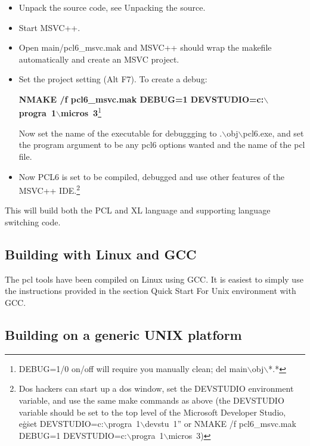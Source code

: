 \documentclass[10pt]{article}
\begin{document}
\begin{itemize}
\item  Unpack the source code, see Unpacking the source.

\item  Start MSVC++.
  
\item Open main/pcl6\_msvc.mak and MSVC++ should wrap the makefile
  automatically and create an MSVC project.
  
\item Set the project setting (Alt F7).  To create a debug:
  
  \textbf{NMAKE /f pcl6\_msvc.mak DEBUG=1
    DEVSTUDIO=c:$\backslash$progra~1$\backslash$micros~3}\footnote{DEBUG=1/0
    on/off will require you manually clean; del
    main$\backslash$obj$\backslash$*.*}
  
  Now set the name of the executable for debuggging to
  $.$$\backslash$obj$\backslash$pcl6.exe, and set the program argument
  to be any pcl6 options wanted and the name of the pcl file.

\item Now PCL6 is set to be compiled, debugged and use other features
  of the MSVC++ IDE.\footnote{Dos hackers can start up a dos window,
    set the DEVSTUDIO environment variable, and use the same make
    commands as above (the DEVSTUDIO variable should be set to the top
    level of the Microsoft Developer Studio, e\.g\. set
    DEVSTUDIO=c:$\backslash$progra~1$\backslash$devstu~1'' or NMAKE /f
    pcl6\_msvc.mak DEBUG=1
    DEVSTUDIO=c:$\backslash$progra~1$\backslash$micros~3)}

\end{itemize}

This will build both the PCL and XL language and supporting language
switching code.

\subsection*{Building with Linux and GCC}

The pcl tools have been compiled on Linux using GCC. It is easiest to
simply use the instructions provided in the section Quick Start For
Unix environment with GCC.

\subsection*{Building on a generic UNIX platform}
\end{document}
